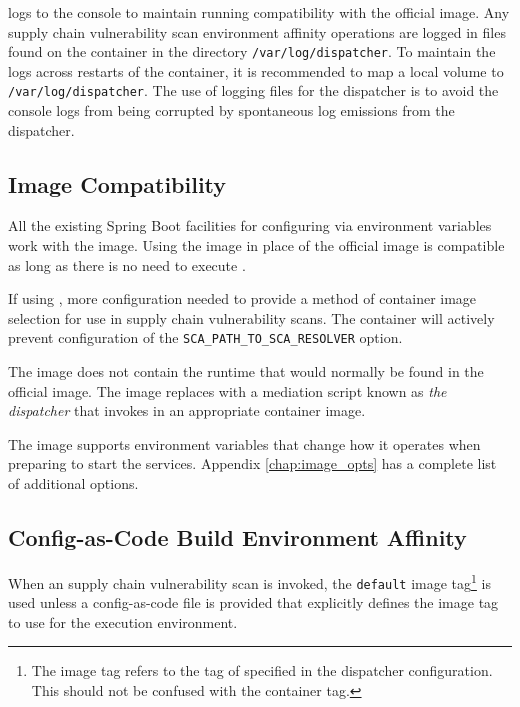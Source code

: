 \cxflow logs to the console to maintain running compatibility with the official \cxflow image.  
Any supply chain vulnerability scan environment affinity operations are logged in files found
on the container in the directory \texttt{/var/log/dispatcher}.  To maintain the logs across
restarts of the container, it is recommended to map a local volume to \texttt{/var/log/dispatcher}.
The use of logging files for the dispatcher is to avoid the console logs from being corrupted
by spontaneous log emissions from the dispatcher.


\subsection{\cxflow Image Compatibility}

All the existing Spring Boot facilities for configuring \cxflow via environment variables work 
with the \cxflowplusplus image.  Using the \cxflowplusplus image in place of the official
\cxflow image is compatible as long as there is no need to execute \scaresolver.

If using \scaresolver, more configuration needed to provide a method of container image selection
for use in supply chain vulnerability scans.  The container will actively prevent
configuration of the \cxflow \texttt{SCA\_PATH\_TO\_SCA\_RESOLVER} option.  

The \cxflowplusplus image does not contain the \scaresolver runtime that would normally be found
in the official \cxflow image.  The \cxflowplusplus image replaces \scaresolver with
a mediation script known as \textit{the dispatcher} that invokes \scaresolver in an appropriate
container image.

The \cxflowplusplus image supports environment variables that change how it operates when 
preparing to start the \cxflow services.  Appendix \ref{chap:image_opts} has a complete list
of \cxflowplusplus additional options.


\subsection{Config-as-Code Build Environment Affinity}
When an supply chain vulnerability scan is invoked, the \texttt{default} 
image tag\footnote{The image tag refers to the tag of specified in the dispatcher configuration.  This should not be confused with the container tag.}
is used unless a config-as-code file is provided that explicitly defines the
image tag to use for the execution environment.

